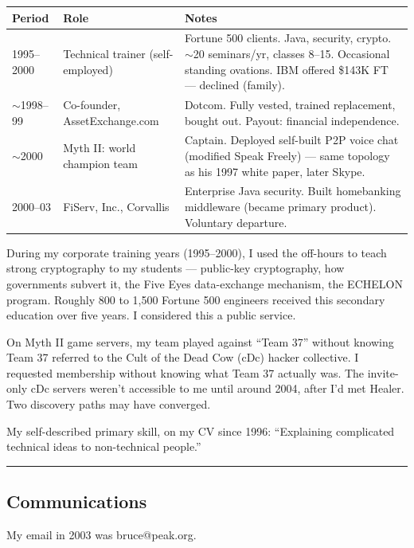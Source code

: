 {%
\small
\begin{tabular}{p{2.5cm} p{4cm} p{7cm}}
\hline
\textbf{Period} & \textbf{Role} & \textbf{Notes} \\
\hline
1995--2000 & Technical trainer (self-employed) & Fortune 500 clients. Java, security, crypto. $\sim$20 seminars/yr, classes 8--15. Occasional standing ovations. IBM offered \$143K FT --- declined (family). \\
$\sim$1998--99 & Co-founder, AssetExchange.com & Dotcom. Fully vested, trained replacement, bought out. Payout: financial independence. \\
$\sim$2000 & Myth II: world champion team & Captain. Deployed self-built P2P voice chat (modified Speak Freely) --- same topology as his 1997 white paper, later Skype. \\
2000--03 & FiServ, Inc., Corvallis & Enterprise Java security. Built homebanking middleware (became primary product). Voluntary departure. \\
\hline
\end{tabular}
}%

\medskip

During my corporate training years (1995--2000), I used the off-hours to teach strong cryptography to my students --- public-key cryptography, how governments subvert it, the Five Eyes data-exchange mechanism, the ECHELON program. Roughly 800 to 1,500 Fortune 500 engineers received this secondary education over five years. I considered this a public service.

On Myth II game servers, my team played against ``Team 37'' without knowing Team 37 referred to the Cult of the Dead Cow (cDc) hacker collective. I requested membership without knowing what Team 37 actually was. The invite-only cDc servers weren't accessible to me until around 2004, after I'd met Healer. Two discovery paths may have converged.

My self-described primary skill, on my CV since 1996: ``Explaining complicated technical ideas to non-technical people.''

\vspace{1cm}\hrule\vspace{1cm}

\subsection*{Communications}
\label{record:tgt-communications-monitoring}

My email in 2003 was bruce@peak.org.

